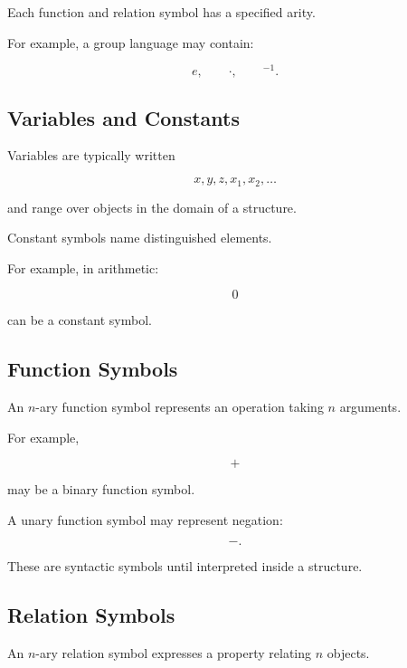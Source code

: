 Each function and relation symbol has a specified arity.

For example, a group language may contain:

\[
\boxed{
e,
\qquad
\cdot,
\qquad
^{-1}.
}
\]

\subsection{Variables and Constants}
\label{subsec:first-order-variables-constants}

Variables are typically written

\[
\boxed{
x,y,z,x_1,x_2,\ldots
}
\]

and range over objects in the domain of a structure.

Constant symbols name distinguished elements.

For example, in arithmetic:

\[
\boxed{
0
}
\]

can be a constant symbol.

\subsection{Function Symbols}
\label{subsec:first-order-function-symbols}

An \(n\)-ary function symbol represents an operation taking \(n\)
arguments.

For example,

\[
\boxed{
+
}
\]

may be a binary function symbol.

A unary function symbol may represent negation:

\[
\boxed{
-.
}
\]

These are syntactic symbols until interpreted inside a structure.

\subsection{Relation Symbols}
\label{subsec:first-order-relation-symbols}

An \(n\)-ary relation symbol expresses a property relating \(n\) objects.

